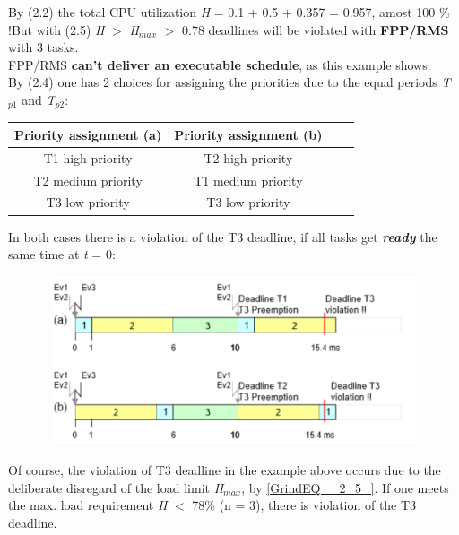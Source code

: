 By (2.2) the total CPU utilization \textit{H} = 0.1 + 0.5 + 0.357 = 0.957, amost 100 \% !But with (2.5) \textit{H} $\mathrm{>}$ \textit{H}${}_{max}$ $\mathrm{>}$ 0.78 deadlines will be violated with \textbf{FPP/RMS} with 3 tasks.\\ 

FPP/RMS \textbf{can't deliver an executable schedule}, as this example shows:\\

By (2.4) one has 2 choices for assigning the priorities due to the equal periods \textit{T}${}_{p1}$\textit{ }and \textit{T}${}_{p2}$:\\

\begin{table}[h!]
\setlength{\tabcolsep}{10pt} %
\renewcommand{\arraystretch}{1.5} %
\small
\centering
 \begin{tabular}{|c|c|c|c|} 
 \hline
 \textbf{Priority assignment (a)} & \textbf{Priority assignment (b)} \\ [0.1ex] 
 \hline
 T1  high priority & T2  high  priority \\ 
 \hline
 T2  medium priority & T1  medium priority \\ 
  \hline
 T3  low priority & T3  low priority  \\ 
 \hline
 \end{tabular}
 \label{Intrinsic}
\end{table}

In both cases there is a violation of the T3 deadline, if all tasks get \textbf{\textit{ready}} the same time at \textit{t} = 0: 

 	\begin{figure}[h]
    \centering
    \includegraphics[width=12cm, height=5cm]{Images/image100.png}
    \label{fig:Fig }
    \end{figure}
    
Of course, the violation of T3 deadline in the example above occurs due to the deliberate disregard of the load limit \textit{H${}_{max}$}, by \eqref{GrindEQ__2_5_}. If one meets the max. load requirement \textit{H} $\mathrm{<}$ 78\% (n = 3), there is violation of the T3 deadline.\\

